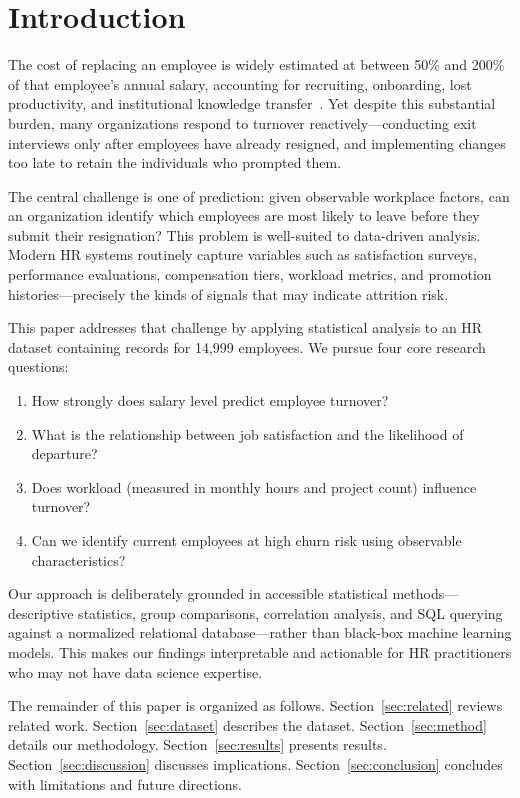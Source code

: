 \documentclass[conference]{IEEEtran}
\begin{document}
\section{Introduction}

The cost of replacing an employee is widely estimated at between 50\% and
200\% of that employee's annual salary, accounting for recruiting, onboarding,
lost productivity, and institutional knowledge transfer~\cite{griffeth2000}.
Yet despite this substantial burden, many organizations respond to turnover
reactively---conducting exit interviews only after employees have already
resigned, and implementing changes too late to retain the individuals who
prompted them.

The central challenge is one of prediction: given observable workplace
factors, can an organization identify which employees are most likely to leave
before they submit their resignation? This problem is well-suited to
data-driven analysis. Modern HR systems routinely capture variables such as
satisfaction surveys, performance evaluations, compensation tiers, workload
metrics, and promotion histories---precisely the kinds of signals that may
indicate attrition risk.

This paper addresses that challenge by applying statistical analysis to an HR
dataset containing records for 14,999 employees. We pursue four core research
questions:
\begin{enumerate}
  \item How strongly does salary level predict employee turnover?
  \item What is the relationship between job satisfaction and the likelihood
        of departure?
  \item Does workload (measured in monthly hours and project count) influence
        turnover?
  \item Can we identify current employees at high churn risk using observable
        characteristics?
\end{enumerate}

Our approach is deliberately grounded in accessible statistical
methods---descriptive statistics, group comparisons, correlation analysis, and
SQL querying against a normalized relational database---rather than black-box
machine learning models. This makes our findings interpretable and actionable
for HR practitioners who may not have data science expertise.

The remainder of this paper is organized as follows. Section~\ref{sec:related}
reviews related work. Section~\ref{sec:dataset} describes the dataset.
Section~\ref{sec:method} details our methodology. Section~\ref{sec:results}
presents results. Section~\ref{sec:discussion} discusses implications.
Section~\ref{sec:conclusion} concludes with limitations and future directions.
\end{document}
